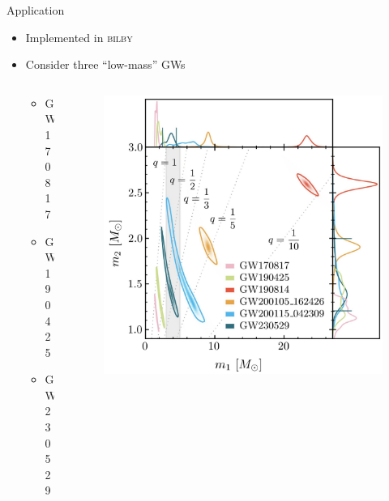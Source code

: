 \documentclass[usenames,dvipsnames,t]{beamer}
\begin{document}
\begin{frame}{Application}

  \begin{itemize}
    \item Implemented in \textsc{bilby}

    \item Consider three ``low-mass'' GWs
  

  \begin{columns}
      \begin{column}{0.30\textwidth}
        \begin{itemize}
          \item GW170817
          \item GW190425
          \item GW230529
        \end{itemize}
      \end{column}
      
      \begin{column}{0.69\textwidth}
        \begin{figure}
          \centering
          \includegraphics[width=0.75\linewidth]{Figures/GW230529_mass_diagram.jpg}
        \end{figure}
      \end{column}
    \end{columns}
    \end{itemize}

\end{frame}
\end{document}
